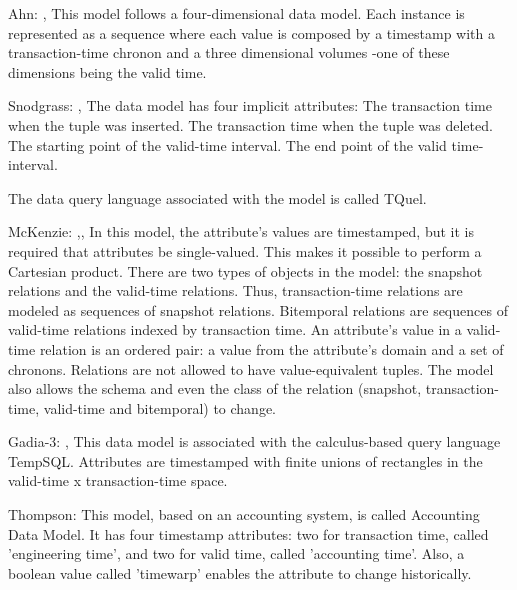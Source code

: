 Ahn: \cite{Snodgrass:1985:TTD:318898.318921},\cite{sno86} This model follows a four-dimensional data model. Each instance is represented as a sequence where each value is composed by a timestamp with a transaction-time chronon and a three dimensional volumes -one of these dimensions being the valid time.

Snodgrass:  \cite{sno86},\cite{Snodgrass:1984:TQL:588011.588041} The data model has four implicit attributes: 
The transaction time when the tuple was inserted.
The transaction time when the tuple was deleted.
The starting point of the valid-time interval.
The end point of the valid time-interval.
	
	The data query language associated with the model is called TQuel.

McKenzie: \cite{Snodgrass:1993:ATQ:642875.642890},\cite{Mckenzie:1988:ALQ:915060}, \cite{mck81} In this model, the attribute's values are timestamped, but it is required that attributes be single-valued. This makes it possible to perform a Cartesian product. There are two types of objects in the model: the snapshot relations and the valid-time relations. Thus, transaction-time relations are modeled as sequences of snapshot relations. Bitemporal relations are sequences of valid-time relations indexed by transaction time. An attribute's value in a valid-time relation is an ordered pair: a value from the attribute's domain and a set of chronons. Relations are not allowed to have value-equivalent tuples. The model also allows the schema and even the class of the relation (snapshot, transaction-time, valid-time and bitemporal) to change.

Gadia-3: \cite{Bhargava:1993:RDS:642811.642819},\cite{gad92} This data model is associated with the calculus-based query language TempSQL. Attributes are timestamped with finite unions of rectangles in the valid-time x transaction-time space.

Thompson: \cite{171833} This model, based on an accounting system, is called Accounting Data Model. It has four timestamp attributes: two for transaction time, called 'engineering time', and two for valid time, called 'accounting time'. Also, a boolean value called 'timewarp' enables the attribute to change historically. 

